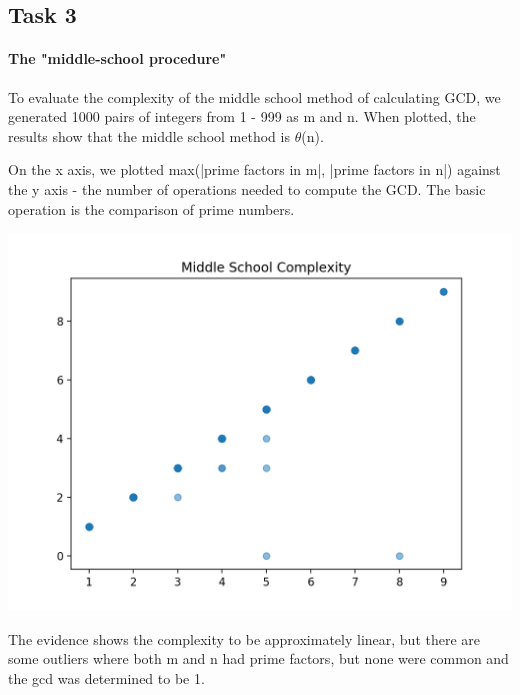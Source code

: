 \documentclass{report}
\begin{document}
\begin{flushleft}
		\section{Task 3}

		\paragraph{The "middle-school procedure"}
		To evaluate the complexity of the middle school method of calculating GCD, we generated 1000 pairs of integers from 1 - 999 as m and n. When plotted, the results
		show that the middle school method is $\theta$(n).

		On the x axis, we plotted max(|prime factors in m|, |prime factors in n|) against the y axis - the number of operations needed
		to compute the GCD. The basic operation is the comparison of prime numbers.

		\includegraphics{task3}

		The evidence shows the complexity to be approximately linear, but there are some outliers where 
		both m and n had prime factors, but none were common and the gcd was determined to be 1.


	\end{flushleft}
\end{document}
